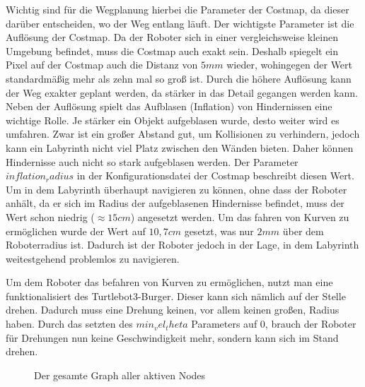 {{			
			Wichtig sind für die Wegplanung hierbei die Parameter der Costmap, da dieser darüber entscheiden, wo der Weg entlang läuft. Der wichtigste Parameter ist die Auflösung der Costmap. Da der Roboter sich in einer vergleichsweise kleinen Umgebung befindet, muss die Costmap auch exakt sein. Deshalb spiegelt ein Pixel auf der Costmap auch die Distanz von $5 \si{mm}$ wieder, wohingegen der Wert standardmäßig mehr als zehn mal so groß ist. Durch die höhere Auflösung kann der Weg exakter geplant werden, da stärker in das Detail gegangen werden kann. Neben der Auflösung spielt das Aufblasen (Inflation) von Hindernissen eine wichtige Rolle. Je stärker ein Objekt aufgeblasen wurde, desto weiter wird es umfahren. Zwar ist ein großer Abstand gut, um Kollisionen zu verhindern, jedoch kann ein Labyrinth nicht viel Platz zwischen den Wänden bieten. Daher können Hindernisse auch nicht so stark aufgeblasen werden. Der Parameter $inflation_radius$ in der Konfigurationsdatei der Costmap beschreibt diesen Wert. Um in dem Labyrinth überhaupt navigieren zu können, ohne dass der Roboter anhält, da er sich im Radius der aufgeblasenen Hindernisse befindet, muss der Wert schon niedrig ($\approx 15\si{cm}$) angesetzt werden. Um das fahren von Kurven zu ermöglichen wurde der Wert auf $10,7 \si{cm}$ gesetzt, was nur $2 \si{mm}$ über dem Roboterradius ist. Dadurch ist der Roboter jedoch in der Lage, in dem Labyrinth weitestgehend problemlos zu navigieren.
			
			Um dem Roboter das befahren von Kurven zu ermöglichen, nutzt man eine funktionalisiert des Turtlebot3-Burger. Dieser kann sich nämlich auf der Stelle drehen. Dadurch muss eine Drehung keinen, vor allem keinen großen, Radius haben. Durch das setzten des $min_vel_theta$ Parameters auf $0$, brauch der Roboter für Drehungen nun keine Geschwindigkeit mehr, sondern kann sich im Stand drehen.
			
			\begin{landscape}
				\begin{figure}[htbp]
					\centering
					\caption[short]{Der gesamte Graph aller aktiven Nodes}
					\label{pic:rosgfullfront}
				\end{figure}
			\end{landscape}

			
			
		}
}	